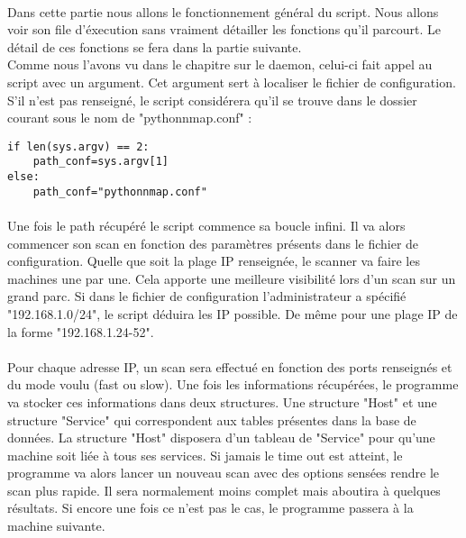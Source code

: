 \documentclass[12pt]{report}
\begin{document}
		\paragraph{}
			Dans cette partie nous allons le fonctionnement général du script. Nous allons voir son file d'éxecution sans vraiment détailler les fonctions qu'il parcourt. Le détail de ces fonctions se fera dans la partie suivante.\\
			Comme nous l'avons vu dans le chapitre sur le daemon, celui-ci fait appel au script avec un argument. Cet argument sert à localiser le fichier de configuration. S'il n'est pas renseigné, le script considérera qu'il se trouve dans le dossier courant sous le nom de "pythonnmap.conf" :
			\begin{lstlisting}[caption=Récupération path fichier configuration, captionpos=b]
if len(sys.argv) == 2:
    path_conf=sys.argv[1]
else:
    path_conf="pythonnmap.conf"
			\end{lstlisting}
		\paragraph{}
			Une fois le path récupéré le script commence sa boucle infini. Il va alors commencer son scan en fonction des paramètres présents dans le fichier de configuration. Quelle que soit la plage IP renseignée, le scanner va faire les machines une par une. Cela apporte une meilleure visibilité lors d'un scan sur un grand parc. Si dans le fichier de configuration l'administrateur a spécifié "192.168.1.0/24", le script déduira les IP possible. De même pour une plage IP de la forme "192.168.1.24-52".
		\paragraph{}
			Pour chaque adresse IP, un scan sera effectué en fonction des ports renseignés et du mode voulu (fast ou slow). Une fois les informations récupérées, le programme va stocker ces informations dans deux structures. Une structure "Host" et une structure "Service" qui correspondent aux tables présentes dans la base de données. La structure "Host" disposera d'un tableau de "Service" pour qu'une machine soit liée à tous ses services. Si jamais le time out est atteint, le programme va alors lancer un nouveau scan avec des options sensées rendre le scan plus rapide. Il sera normalement moins complet mais aboutira à quelques résultats. Si encore une fois ce n'est pas le cas, le programme passera à la machine suivante.
\end{document}
